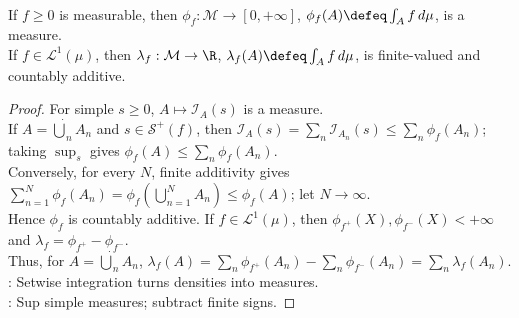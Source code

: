 \begin{theorem} \label{thm:integral-countably-additive-set-function} \\
If $f\geq0$ is measurable, then $\phi_f:\mathcal{M}\to[0,+\infty]$, $\phi_f(A)\defeq\int_A f\,d\mu$, is a measure.\\
If $f\in\mathscr{L}^1(\mu)$, then $\lambda_f:\mathcal{M}\to\R$, $\lambda_f(A)\defeq\int_A f\,d\mu$, is finite-valued and countably additive.
\begin{proof} For simple $s\geq0$, $A\mapsto\mathcal{I}_A(s)$ is a measure.\\
If $A=\dot\bigcup_nA_n$ and $s\in\mathcal{S}^+(f)$, then $\mathcal{I}_A(s)=\sum_n\mathcal{I}_{A_n}(s)\leq\sum_n\phi_f(A_n)$; taking $\sup_s$ gives $\phi_f(A)\leq\sum_n\phi_f(A_n)$.\\
Conversely, for every $N$, finite additivity gives $\sum_{n=1}^{N}\phi_f(A_n)=\phi_f(\bigcup_{n=1}^{N}A_n)\leq\phi_f(A)$; let $N\to\infty$.\\
Hence $\phi_f$ is countably additive. If $f\in\mathscr{L}^1(\mu)$, then $\phi_{f^+}(X),\phi_{f^-}(X)<+\infty$ and $\lambda_f=\phi_{f^+}-\phi_{f^-}$.\\
Thus, for $A=\dot\bigcup_nA_n$, $\lambda_f(A)=\sum_n\phi_{f^+}(A_n)-\sum_n\phi_{f^-}(A_n)=\sum_n\lambda_f(A_n)$.
: Setwise integration turns densities into measures.\\
: Sup simple measures; subtract finite signs.
\end{proof}
\end{theorem}

